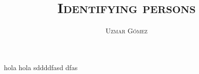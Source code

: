 \documentclass[10pt,letterpaper]{article}
\title{{\scshape\huge Identifying persons}}
\author{{\scshape\Large Uzmar Gómez}}
\begin{document}
\maketitle

hola hola sddddfasd dfas
\end{document}
